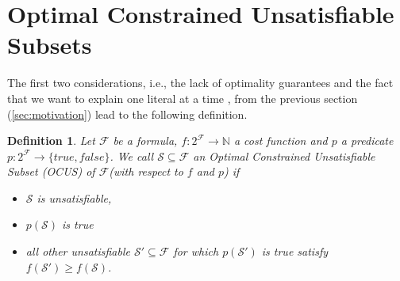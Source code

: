 \documentclass[twoside,11pt]{article}
\newcommand\m[1]{\mathcal{#1}}
\newtheorem{definition}[thm]{Definition}
\newcommand\comment[1]{\marginpar{\tiny #1}}
\renewcommand\comment[1]{#1}
\newcommand{\tias}[1]{{\comment{\color{blue}Tias:#1}}}
\newcommand{\bart}[1]{{\comment{\color{OliveGreen}Bart: #1}}}
\newcommand\formula{\ensuremath{\m{F} }\xspace}
\newcommand\formulag{\ensuremath{\m{G} }\xspace}
\newcommand\mm[1]{\ensuremath{#1}\xspace}
\newcommand\nat{\mm{\mathbb{N}}}
\begin{document}

\section{Optimal Constrained Unsatisfiable Subsets}\label{sec:OCUS}

The first two considerations, i.e., 
the lack of optimality guarantees and the fact that we want to explain one literal at a time%
, from the previous section (\cref{sec:motivation}) lead to the following definition.
%

\begin{definition}\label{definition:ocus}
Let $\formula$ be a formula, $f:2^{\formula} \to \nat$ a cost function and  $p$ a predicate $p: 2^{\formula} \to \{\mathit{true}, \mathit{false} \}$. 
We call %
$\m{S} \subseteq \formula$ an \emph{Optimal Constrained Unsatisfiable Subset (OCUS)} of \formula (with respect to $f$ and $p$) if 
\begin{itemize}                                      
\item $\m{S}$ is unsatisfiable,
\item $p(\m{S})$ is true
\item all other unsatisfiable $\m{S}'\subseteq \formula$ for which $p(\m{S}')$ is true satisfy $f(\m{S}')\geq f(\m{S})$.
\end{itemize}
\end{definition}
\end{document}
